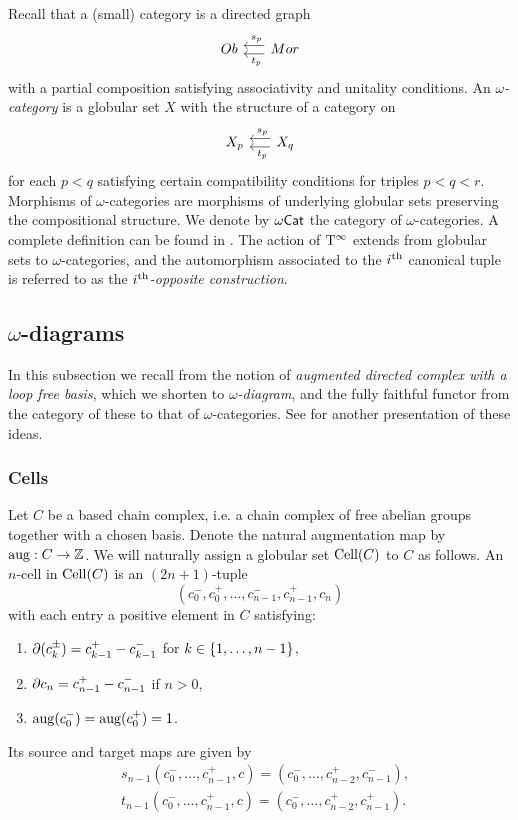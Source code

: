 Recall that a (small) category is a directed graph
\[
\begin{tikzcd}[column sep=15pt]
	Ob & \arrow[l,"\ s_p"',shift right=3pt] \arrow[l,"\ t_p",shift left=3pt] Mor
\end{tikzcd}
\]
with a partial composition satisfying associativity and unitality conditions.
An \textit{$\omega$-category} is a globular set $X$ with the structure of a category on
\[
\begin{tikzcd}[column sep=15pt]
	X_p & \arrow[l,"\ s_p"',shift right=3pt] \arrow[l,"\ t_p",shift left=3pt] X_q
\end{tikzcd}
\]
for each $p < q$ satisfying certain compatibility conditions for triples $p<q<r$.
Morphisms of $\omega$-categories are morphisms of underlying globular sets preserving the compositional structure.
We denote by $\omega\mathsf{Cat}$ the category of $\omega$-categories.
A complete definition can be found in \cite[\S1.2]{forest2022pasting}.
The action of $\mathrm{T}^\infty$ extends from globular sets to $\omega$-categories, and the automorphism associated to the $i^{\mathrm{th}}$ canonical tuple is referred to as the \textit{$i^{\mathrm{th}}$-opposite construction}.

\subsection{$\omega$-diagrams}

In this subsection we recall from \cite{steiner2004omega} the notion of \textit{augmented directed complex with a loop free basis}, which we shorten to \textit{$\omega$-diagram}, and the fully faithful functor from the category of these to that of $\omega$-categories.
See \cite[\S1.6]{forest2022pasting} for another presentation of these ideas.

\subsubsection{Cells}

Let $C$ be a based chain complex, i.e. a chain complex of free abelian groups together with a chosen basis.
Denote the natural augmentation map by $\operatorname{aug}: C \to \mathbb{Z}$.
We will naturally assign a globular set $\mathrm{Cell}(C)$ to $C$ as follows.
An $n$-cell in $\mathrm{Cell}(C)$ is an $(2n+1)$-tuple
\[
(c_0^-,c_0^+,\dots,c_{n-1}^-,c_{n-1}^+,c_n)
\]
with each entry a positive element in $C$ satisfying:
\begin{enumerate}
	\item $\partial(c_k^\pm) = c_{k-1}^+ - c_{k-1}^-$ for $k \in \{1,\dots,n-1\}$,
	\item $\partial c_n = c_{n-1}^+ - c_{n-1}^-$ if $n > 0$,
	\item $\operatorname{aug}(c_0^-) = \operatorname{aug}(c_0^+) = 1$.
\end{enumerate}
Its source and target maps are given by
\begin{align*}
	&s_{n-1}(c_0^-, \dots, c_{n-1}^+, c) =
	(c_0^-, \dots, c_{n-2}^+, c_{n-1}^-), \\
	&t_{n-1}(c_0^-, \dots, c_{n-1}^+, c) =
	(c_0^-, \dots, c_{n-2}^+, c_{n-1}^+).
\end{align*}

